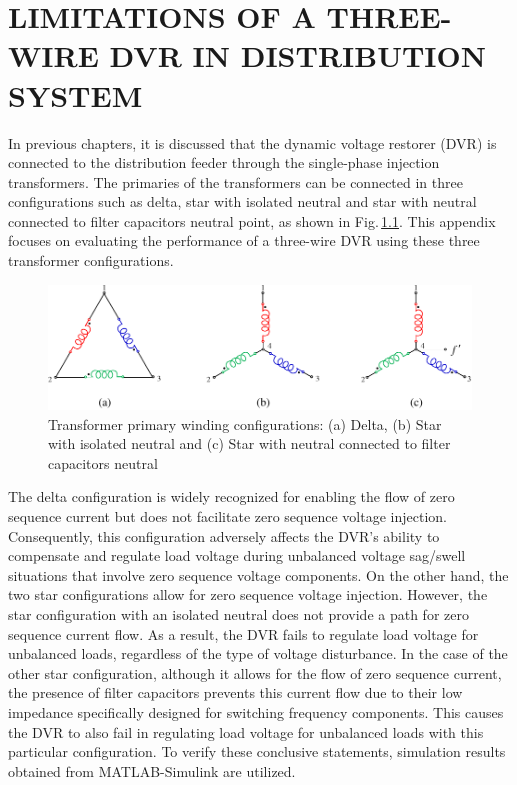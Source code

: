 \chapter{LIMITATIONS OF A THREE-WIRE DVR IN DISTRIBUTION SYSTEM}

In previous chapters, it is discussed that the dynamic voltage restorer (DVR) is connected to the distribution feeder through the single-phase injection transformers. The primaries of the transformers can be connected in three configurations such as delta, star with isolated neutral and star with neutral connected to filter capacitors neutral point, as shown in Fig.\,\ref{B1.fig2}. This appendix focuses on evaluating the performance of a three-wire DVR using these three transformer configurations. 
\begin{figure}[]\centering
	\includegraphics[scale=0.75]{figures/Appendix/TF_Config.pdf}
	\caption{Transformer primary winding configurations: (a) Delta, (b) Star with isolated neutral and (c) Star with neutral connected to filter capacitors neutral} %
	\label{B1.fig2}
\end{figure} 

The delta configuration is widely recognized for enabling the flow of zero sequence current but does not facilitate zero sequence voltage injection. Consequently, this configuration adversely affects the DVR's ability to compensate and regulate load voltage during unbalanced voltage sag/swell situations that involve zero sequence voltage components. On the other hand, the two star configurations allow for zero sequence voltage injection. However, the star configuration with an isolated neutral does not provide a path for zero sequence current flow. As a result, the DVR fails to regulate load voltage for unbalanced loads, regardless of the type of voltage disturbance. In the case of the other star configuration, although it allows for the flow of zero sequence current, the presence of filter capacitors prevents this current flow due to their low impedance specifically designed for switching frequency components. This causes the DVR to also fail in regulating load voltage for unbalanced loads with this particular configuration. To verify these conclusive statements, simulation results obtained from MATLAB-Simulink are utilized. 


